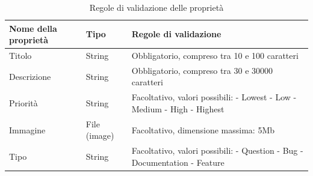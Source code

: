\begin{table}[H]
    \centering
    \renewcommand{\arraystretch}{1.5}
    \begin{tabular}{|p{4cm}|p{4cm}|p{6cm}|}
        \hline
        \textbf{Nome della proprietà} & \textbf{Tipo} & \textbf{Regole di validazione} \\
        \hline
        Titolo & String & Obbligatorio, compreso tra 10 e 100 caratteri \\
        \hline
        Descrizione & String & Obbligatorio, compreso tra 30 e 30000 caratteri \\
        \hline
        Priorità & String & Facoltativo, valori possibili: \newline
        - Lowest \newline
        - Low \newline
        - Medium \newline
        - High \newline
        - Highest \\
        \hline
        Immagine & File (image) & Facoltativo, dimensione massima: 5Mb \\
        \hline
        Tipo & String & Facoltativo, valori possibili: \newline
        - Question \newline
        - Bug \newline
        - Documentation \newline
        - Feature \\
        \hline
    \end{tabular}
    \caption{Regole di validazione delle proprietà}
    \label{tab:uc1-proprieta}
\end{table}
\newpage